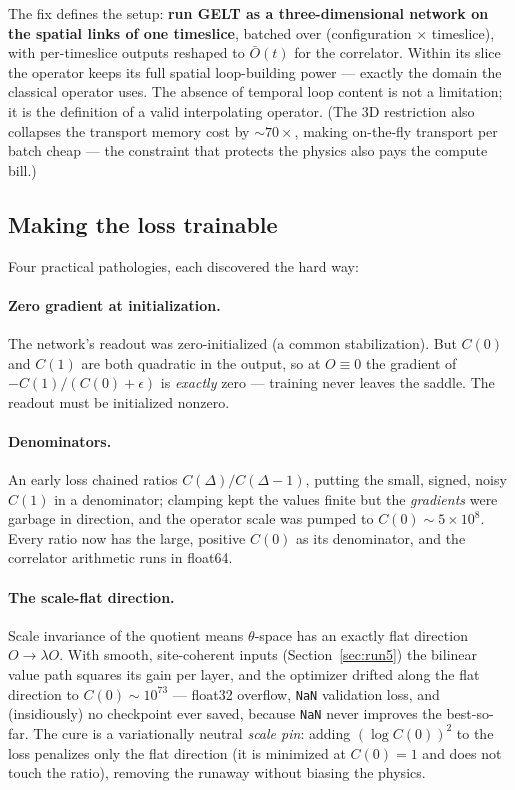 \documentclass[11pt,a4paper]{article}
\newcommand{\Obar}{\bar{O}}
\begin{document}
The fix defines the setup: \textbf{run GELT as a three-dimensional network on
the spatial links of one timeslice}, batched over
(configuration $\times$ timeslice), with per-timeslice outputs reshaped to
$\Obar(t)$ for the correlator. Within its slice the operator keeps its full
spatial loop-building power --- exactly the domain the classical operator
uses. The absence of temporal loop content is not a limitation; it is the
definition of a valid interpolating operator. (The 3D restriction also
collapses the transport memory cost by $\sim70\times$, making on-the-fly
transport per batch cheap --- the constraint that protects the physics also
pays the compute bill.)

\subsection{Making the loss trainable}
\label{sec:pitfalls}

Four practical pathologies, each discovered the hard way:

\paragraph{Zero gradient at initialization.} The network's readout was
zero-initialized (a common stabilization). But $C(0)$ and $C(1)$ are both
quadratic in the output, so at $O\equiv0$ the gradient of $-C(1)/(C(0)+\epsilon)$
is \emph{exactly} zero --- training never leaves the saddle. The readout must
be initialized nonzero.

\paragraph{Denominators.} An early loss chained ratios
$C(\Delta)/C(\Delta{-}1)$, putting the small, signed, noisy $C(1)$ in a
denominator; clamping kept the values finite but the \emph{gradients} were
garbage in direction, and the operator scale was pumped to $C(0)\sim5\times10^8$.
Every ratio now has the large, positive $C(0)$ as its denominator, and the
correlator arithmetic runs in float64.

\paragraph{The scale-flat direction.} Scale invariance of the quotient means
$\theta$-space has an exactly flat direction $O\to\lambda O$. With smooth,
site-coherent inputs (Section~\ref{sec:run5}) the bilinear value path squares
its gain per layer, and the optimizer drifted along the flat direction to
$C(0)\sim10^{73}$ --- float32 overflow, \texttt{NaN} validation loss, and
(insidiously) no checkpoint ever saved, because \texttt{NaN} never improves
the best-so-far. The cure is a variationally neutral \emph{scale pin}: adding
$(\log C(0))^2$ to the loss penalizes only the flat direction (it is minimized
at $C(0)=1$ and does not touch the ratio), removing the runaway without
biasing the physics.
\end{document}
